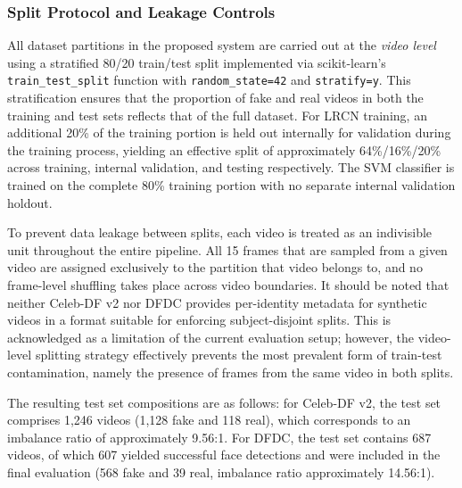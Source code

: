 
\subsubsection*{Split Protocol and Leakage Controls}

All dataset partitions in the proposed system are carried out at the \textit{video level} using a stratified 80/20 train/test split implemented via scikit-learn's \texttt{train\_test\_split} function with \texttt{random\_state=42} and \texttt{stratify=y}. This stratification ensures that the proportion of fake and real videos in both the training and test sets reflects that of the full dataset. For LRCN training, an additional 20\% of the training portion is held out internally for validation during the training process, yielding an effective split of approximately 64\%/16\%/20\% across training, internal validation, and testing respectively. The SVM classifier is trained on the complete 80\% training portion with no separate internal validation holdout.

To prevent data leakage between splits, each video is treated as an indivisible unit throughout the entire pipeline. All 15 frames that are sampled from a given video are assigned exclusively to the partition that video belongs to, and no frame-level shuffling takes place across video boundaries. It should be noted that neither Celeb-DF v2 nor DFDC provides per-identity metadata for synthetic videos in a format suitable for enforcing subject-disjoint splits. This is acknowledged as a limitation of the current evaluation setup; however, the video-level splitting strategy effectively prevents the most prevalent form of train-test contamination, namely the presence of frames from the same video in both splits.

The resulting test set compositions are as follows: for Celeb-DF v2, the test set comprises 1,246 videos (1,128 fake and 118 real), which corresponds to an imbalance ratio of approximately 9.56:1. For DFDC, the test set contains 687 videos, of which 607 yielded successful face detections and were included in the final evaluation (568 fake and 39 real, imbalance ratio approximately 14.56:1).



